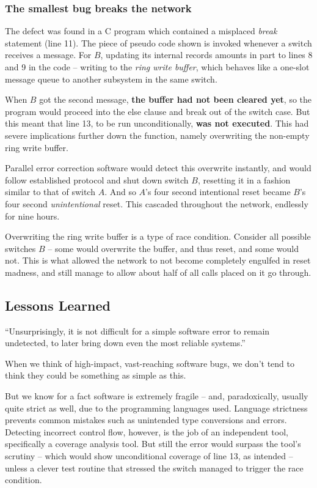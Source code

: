 \documentclass[12pt,a4paper,notitlepage]{article}
\begin{document}
\subsubsection{The smallest bug breaks the network}

The defect was found in a \textsf{C} program which contained a misplaced \textit{break} statement (line 11).\supercite{att-dennisburke1995,att-popularscience1990}
The piece of pseudo code shown is invoked whenever a switch receives a message.\supercite{att-popularscience1990}
For $B$, updating its internal records amounts in part to lines 8 and 9 in the code -- writing to the \textsl{ring write buffer}, which behaves like a one-slot message queue to another subsystem in the same switch.

When $B$ got the second message, \textbf{the buffer had not been cleared yet}, so the program would proceed into the else clause and break out of the switch case.
But this meant that line 13, to be run unconditionally, \textbf{was not executed}.
This had severe implications further down the function, namely overwriting the non-empty ring write buffer.

Parallel error correction software would detect this overwrite instantly, and would follow established protocol and shut down switch $B$, resetting it in a fashion similar to that of switch $A$.
And so $A$'s four second intentional reset became $B$'s four second \emph{unintentional} reset.
This cascaded throughout the network, endlessly for nine hours.

Overwriting the ring write buffer is a type of race condition.
Consider all possible switches $B$ -- some would overwrite the buffer, and thus reset, and some would not.
This is what allowed the network to not become completely engulfed in reset madness, and still manage to allow about half of all calls placed on it go through.

\subsection{Lessons Learned}

``Unsurprisingly, it is not difficult for a simple software error to remain undetected, to later bring down even the most reliable systems.''\supercite{att-dennisburke1995}

When we think of high-impact, vast-reaching software bugs, we don't tend to think they could be something as simple as this.

But we know for a fact software is extremely fragile -- and, paradoxically, usually quite strict as well, due to the programming languages used.
Language strictness prevents common mistakes such as unintended type conversions and errors.
Detecting incorrect control flow, however, is the job of an independent tool, specifically a coverage analysis tool.
But still the error would surpass the tool's scrutiny -- which would show unconditional coverage of line 13, as intended -- unless a clever test routine that stressed the switch managed to trigger the race condition.
\end{document}
